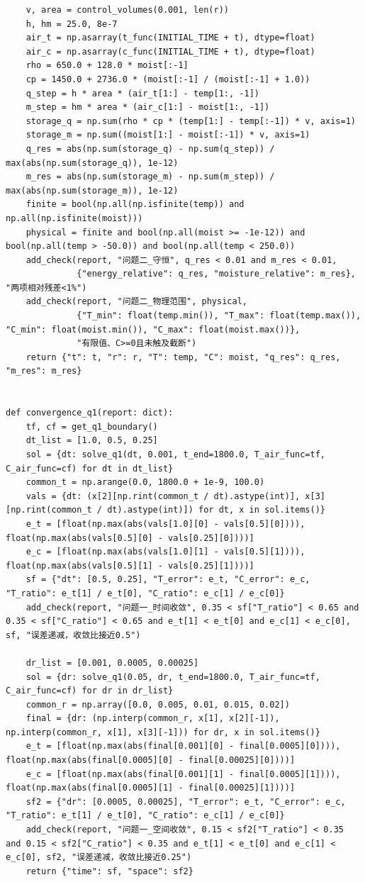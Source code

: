\documentclass[withoutpreface,bwprint]{cumcm_thesis}
\begin{document}
\begin{appendices}
\begin{lstlisting}
    v, area = control_volumes(0.001, len(r))
    h, hm = 25.0, 8e-7
    air_t = np.asarray(t_func(INITIAL_TIME + t), dtype=float)
    air_c = np.asarray(c_func(INITIAL_TIME + t), dtype=float)
    rho = 650.0 + 128.0 * moist[:-1]
    cp = 1450.0 + 2736.0 * (moist[:-1] / (moist[:-1] + 1.0))
    q_step = h * area * (air_t[1:] - temp[1:, -1])
    m_step = hm * area * (air_c[1:] - moist[1:, -1])
    storage_q = np.sum(rho * cp * (temp[1:] - temp[:-1]) * v, axis=1)
    storage_m = np.sum((moist[1:] - moist[:-1]) * v, axis=1)
    q_res = abs(np.sum(storage_q) - np.sum(q_step)) / max(abs(np.sum(storage_q)), 1e-12)
    m_res = abs(np.sum(storage_m) - np.sum(m_step)) / max(abs(np.sum(storage_m)), 1e-12)
    finite = bool(np.all(np.isfinite(temp)) and np.all(np.isfinite(moist)))
    physical = finite and bool(np.all(moist >= -1e-12)) and bool(np.all(temp > -50.0)) and bool(np.all(temp < 250.0))
    add_check(report, "问题二_守恒", q_res < 0.01 and m_res < 0.01,
              {"energy_relative": q_res, "moisture_relative": m_res}, "两项相对残差<1%")
    add_check(report, "问题二_物理范围", physical,
              {"T_min": float(temp.min()), "T_max": float(temp.max()), "C_min": float(moist.min()), "C_max": float(moist.max())},
              "有限值、C>=0且未触及截断")
    return {"t": t, "r": r, "T": temp, "C": moist, "q_res": q_res, "m_res": m_res}


def convergence_q1(report: dict):
    tf, cf = get_q1_boundary()
    dt_list = [1.0, 0.5, 0.25]
    sol = {dt: solve_q1(dt, 0.001, t_end=1800.0, T_air_func=tf, C_air_func=cf) for dt in dt_list}
    common_t = np.arange(0.0, 1800.0 + 1e-9, 100.0)
    vals = {dt: (x[2][np.rint(common_t / dt).astype(int)], x[3][np.rint(common_t / dt).astype(int)]) for dt, x in sol.items()}
    e_t = [float(np.max(abs(vals[1.0][0] - vals[0.5][0]))), float(np.max(abs(vals[0.5][0] - vals[0.25][0])))]
    e_c = [float(np.max(abs(vals[1.0][1] - vals[0.5][1]))), float(np.max(abs(vals[0.5][1] - vals[0.25][1])))]
    sf = {"dt": [0.5, 0.25], "T_error": e_t, "C_error": e_c, "T_ratio": e_t[1] / e_t[0], "C_ratio": e_c[1] / e_c[0]}
    add_check(report, "问题一_时间收敛", 0.35 < sf["T_ratio"] < 0.65 and 0.35 < sf["C_ratio"] < 0.65 and e_t[1] < e_t[0] and e_c[1] < e_c[0], sf, "误差递减，收敛比接近0.5")

    dr_list = [0.001, 0.0005, 0.00025]
    sol = {dr: solve_q1(0.05, dr, t_end=1800.0, T_air_func=tf, C_air_func=cf) for dr in dr_list}
    common_r = np.array([0.0, 0.005, 0.01, 0.015, 0.02])
    final = {dr: (np.interp(common_r, x[1], x[2][-1]), np.interp(common_r, x[1], x[3][-1])) for dr, x in sol.items()}
    e_t = [float(np.max(abs(final[0.001][0] - final[0.0005][0]))), float(np.max(abs(final[0.0005][0] - final[0.00025][0])))]
    e_c = [float(np.max(abs(final[0.001][1] - final[0.0005][1]))), float(np.max(abs(final[0.0005][1] - final[0.00025][1])))]
    sf2 = {"dr": [0.0005, 0.00025], "T_error": e_t, "C_error": e_c, "T_ratio": e_t[1] / e_t[0], "C_ratio": e_c[1] / e_c[0]}
    add_check(report, "问题一_空间收敛", 0.15 < sf2["T_ratio"] < 0.35 and 0.15 < sf2["C_ratio"] < 0.35 and e_t[1] < e_t[0] and e_c[1] < e_c[0], sf2, "误差递减，收敛比接近0.25")
    return {"time": sf, "space": sf2}



\end{lstlisting}
\end{appendices}
\end{document}
